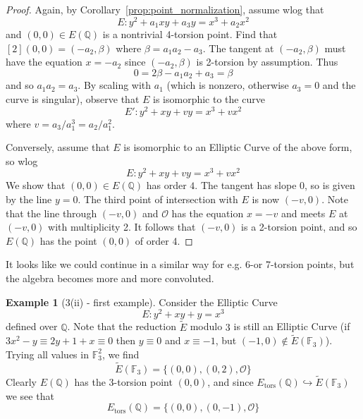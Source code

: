 \documentclass{scrartcl}
\newcommand{\F}{\mathbb{F}}
\newcommand{\Q}{\mathbb{Q}}
\renewcommand{\O}{\mathcal{O}}
\theoremstyle{definition}
\newtheorem{example}[subsection]{Example}
\begin{document}
\begin{proof}
    Again, by Corollary~\ref{prop:point_normalization}, assume wlog that
    \begin{equation*}
        E: y^2 + a_1 x y + a_3 y = x^3 + a_2 x^2
    \end{equation*}
    and $(0, 0) \in E(\Q)$ is a nontrivial 4-torsion point.
    Find that $[2](0, 0) = (-a_2, \beta)$ where $\beta = a_1 a_2 - a_3$.
    The tangent at $(-a_2, \beta)$ must have the equation $x = -a_2$ since $(-a_2, \beta)$ is 2-torsion by assumption.
    Thus
    \begin{equation*}
        0 = 2\beta - a_1a_2 + a_3 = \beta
    \end{equation*}
    and so $a_1a_2 = a_3$.
    By scaling with $a_1$ (which is nonzero, otherwise $a_3 = 0$ and the curve is singular), observe that $E$ is isomorphic to the curve
    \begin{equation*}
        E': y^2 + x y + v y = x^3 + v x^2
    \end{equation*}
    where $v = a_3 / a_1^3 = a_2 / a_1^2$.

    Conversely, assume that $E$ is isomorphic to an Elliptic Curve of the above form, so wlog
    \begin{equation*}
        E: y^2 + x y + v y = x^3 + v x^2
    \end{equation*}
    We show that $(0, 0) \in E(\Q)$ has order $4$.
    The tangent has slope $0$, so is given by the line $y = 0$.
    The third point of intersection with $E$ is now $(-v, 0)$.
    Note that the line through $(-v, 0)$ and $\O$ has the equation $x = -v$ and meets $E$ at $(-v, 0)$ with multiplicity 2.
    It follows that $(-v, 0)$ is a 2-torsion point, and so $E(\Q)$ has the point $(0, 0)$ of order 4.
\end{proof}
It looks like we could continue in a similar way for e.g. 6-or 7-torsion points, but the algebra becomes more and more convoluted. 
\begin{example}[3(ii) - first example]
    Consider the Elliptic Curve
    \begin{equation*}
        E: y^2 + x y + y = x^3
    \end{equation*}
    defined over $\Q$.
    Note that the reduction $\tilde{E}$ modulo $3$ is still an Elliptic Curve 
    (if $3x^2 - y \equiv 2y + 1 + x \equiv 0$ then $y \equiv 0$ and $x \equiv -1$, but $(-1, 0) \notin \tilde{E}(\F_3)$).
    Trying all values in $\F_3^2$, we find
    \begin{equation*}
        \tilde{E}(\F_3) = \{ (0, 0), (0, 2), \O \} 
    \end{equation*}
    Clearly $E(\Q)$ has the 3-torsion point $(0, 0)$, and since $E_{\mathrm{tors}}(\Q) \hookrightarrow \tilde{E}(\F_3)$ we see that
    \begin{equation*}
        E_{\mathrm{tors}}(\Q) = \{ (0, 0), (0, -1), \O \}
    \end{equation*}
\end{example}
\end{document}
